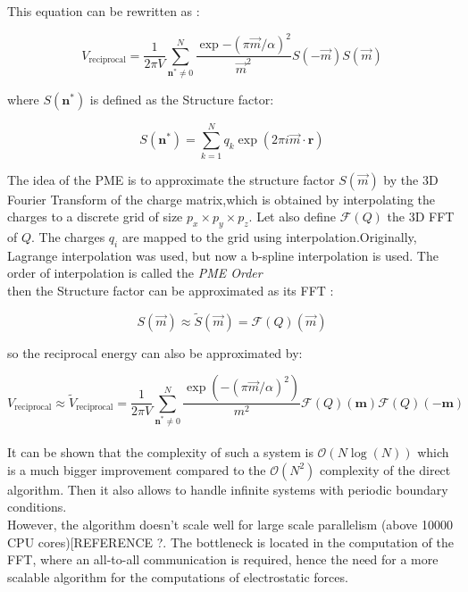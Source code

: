 \documentclass[12pt,twoside,a4paper]{report}
\begin{document}
This equation can be rewritten as :

\begin{equation*}
    V_{\text{reciprocal}} =\frac{1}{2 \pi V} \sum\limits_{\textbf{n}^* \neq 0}^{N}  \frac{\exp{-(\pi \overrightarrow{m}/\alpha)^2}}{\overrightarrow{m}^2}S(-\overrightarrow{m} )S(\overrightarrow{m} )
\end{equation*}

where $S(\textbf{n}^* )$ is defined as the Structure factor:

\begin{equation}
    S(\textbf{n}^* ) = \sum\limits_{k=1}^{N} {q_k \exp(2 \pi i \vec{m} \cdot \textbf{r}) }
\end{equation}


The idea of the PME is to approximate the structure factor $S(\vec{m})$ by the 3D Fourier Transform of the charge matrix,which is obtained by interpolating the charges to a discrete grid of size $ p_x \times p_y \times p_z $. 
	Let also define $\mathcal{F}(Q)$ the 3D FFT of $Q$. The charges $q_i$ are mapped to the grid using interpolation.Originally, Lagrange interpolation was used, but now a b-spline interpolation is used. The order of interpolation is called the \textit{PME Order}\\

then the Structure factor can be approximated as its FFT :

\begin{equation}
   S(\overrightarrow{m}) \approx \widetilde{S}(\overrightarrow{m}) = \mathcal{F}(Q)(\overrightarrow{m})
\end{equation}

so the reciprocal energy can also be approximated by:

\begin{equation}
   V_{\text{reciprocal}} \approx \widetilde{V}_{\text{reciprocal}}   =\frac{1}{2 \pi V} \sum\limits_{\textbf{n}^* \neq 0}^{N}  \frac{\exp{(-(\pi \overrightarrow{m}/\alpha)^2)}}{m^2}\mathcal{F}(Q)(\textbf{m})\mathcal{F}(Q)(-\textbf{m})
\end{equation} \\

It can be shown that the complexity of such a system is $\mathcal{O}(N \log(N))$ which is a much bigger improvement compared to the $\mathcal{O}(N^2)$ complexity of the direct algorithm. Then it also allows to handle infinite systems with periodic boundary conditions.\\ However, the algorithm doesn't scale well for large scale parallelism (above 10000 CPU cores)[REFERENCE ?. The bottleneck is located in the computation of the FFT, where an all-to-all communication is required, hence the need for a more scalable algorithm for the computations of electrostatic forces.
\end{document}
